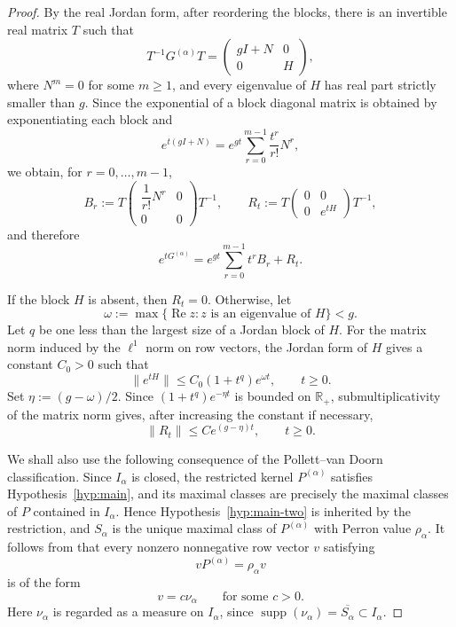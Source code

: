 \documentclass[10pt,letterpaper]{article}
\theoremstyle{compactplain}
\theoremstyle{compactdefinition}
\newcommand{\1}{\mathds{1}}
\begin{document}
\begin{proof}
By the real Jordan form, after reordering the blocks, there is an invertible real
matrix $T$ such that
\[
T^{-1}G^{(\alpha)}T
=
\begin{pmatrix}
 gI+N&0\\
 0&H
\end{pmatrix},
\]
where $N^m=0$ for some $m\geq1$, and every eigenvalue of $H$ has real part
strictly smaller than $g$. Since the exponential of a block diagonal matrix
is obtained by exponentiating each block and
\[
e^{t(gI+N)}
=
e^{gt}\sum_{r=0}^{m-1}\frac{t^r}{r!}N^r,
\]
we obtain, for $r=0,\ldots,m-1$,
\[
B_r
:=
T
\begin{pmatrix}
\dfrac{1}{r!}N^r&0\\
0&0
\end{pmatrix}
T^{-1},
\qquad
R_t
:=
T
\begin{pmatrix}
0&0\\
0&e^{tH}
\end{pmatrix}
T^{-1},
\]
and therefore
\begin{equation}
\label{eq:dominant-expansion-Ialpha}
e^{tG^{(\alpha)}}
=
e^{gt}\sum_{r=0}^{m-1}t^rB_r+R_t.
\end{equation}

If the block $H$ is absent, then $R_t=0$. Otherwise, let
\[
\omega:=\max\{\operatorname{Re}z:z\text{ is an eigenvalue of }H\}<g.
\]
Let $q$ be one less than the largest size of a Jordan block of $H$. For the
matrix norm induced by the $\ell^1$ norm on row vectors, the Jordan form of
$H$ gives a constant $C_0>0$ such that
\[
\|e^{tH}\|\leq C_0(1+t^q)e^{\omega t},
\qquad t\geq0.
\]
Set $\eta:=(g-\omega)/2$. Since
$(1+t^q)e^{-\eta t}$ is bounded on $\mathbb R_+$, submultiplicativity of the
matrix norm gives, after increasing the constant if necessary,
\begin{equation}
\label{eq:remainder-Ialpha}
\|R_t\|
\leq
Ce^{(g-\eta)t},
\qquad t\geq0.
\end{equation}

We shall also use the following consequence of the Pollett--van Doorn
classification. Since $I_\alpha$ is closed, the restricted kernel
$P^{(\alpha)}$ satisfies Hypothesis~\ref{hyp:main}, and its maximal classes
are precisely the maximal classes of $P$ contained in $I_\alpha$. Hence
Hypothesis~\ref{hyp:main-two} is inherited by the restriction, and
$S_\alpha$ is the unique maximal class of $P^{(\alpha)}$ with Perron value
$\rho_\alpha$. It follows from \cite[Theorem~4.1]{pollett2008quasi} that
every nonzero nonnegative row vector $v$ satisfying
\[
vP^{(\alpha)}=\rho_\alpha v
\]
is of the form
\[
v=c\nu_\alpha
\qquad\text{for some }c>0.
\]
Here $\nu_\alpha$ is regarded as a measure on $I_\alpha$, since
$\operatorname{supp}(\nu_\alpha)=\overline{S_\alpha}\subset I_\alpha$.


\end{proof}
\end{document}
